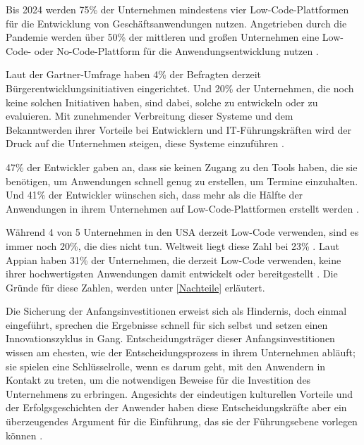 \documentclass[12pt]{article} %
\begin{document}
	Bis 2024 werden 75\% der Unternehmen mindestens vier Low-Code-Plattformen für die Entwicklung von Geschäftsanwendungen nutzen. Angetrieben durch die Pandemie werden über 50\% der mittleren und großen Unternehmen eine Low-Code- oder No-Code-Plattform für die Anwendungsentwicklung nutzen \autocite{KevinShuler.2023}. \newline
	
	Laut der Gartner-Umfrage haben 4\% der Befragten derzeit Bürgerentwicklungsinitiativen eingerichtet. Und 20\% der Unternehmen, die noch keine solchen Initiativen haben, sind dabei, solche zu entwickeln oder zu evaluieren. Mit zunehmender Verbreitung dieser Systeme und dem Bekanntwerden ihrer Vorteile bei Entwicklern und IT-Führungskräften wird der Druck auf die Unternehmen steigen, diese Systeme einzuführen \autocite{KevinShuler.2023}. \newline
	
	47\% der Entwickler gaben an, dass sie keinen Zugang zu den Tools haben, die sie benötigen, um Anwendungen schnell genug zu erstellen, um Termine einzuhalten. Und 41\% der Entwickler wünschen sich, dass mehr als die Hälfte der Anwendungen in ihrem Unternehmen auf Low-Code-Plattformen erstellt werden \autocite{KevinShuler.2023}. \newline
	
	Während 4 von 5 Unternehmen in den USA derzeit Low-Code verwenden, sind es immer noch 20\%, die dies nicht tun. Weltweit liegt diese Zahl bei 23\% \autocite{KevinShuler.2023}. Laut Appian haben 31\% der Unternehmen, die derzeit Low-Code verwenden, keine ihrer hochwertigsten Anwendungen damit entwickelt oder bereitgestellt \autocite{KevinShuler.2023}. Die Gründe für diese Zahlen, werden unter \ref{Nachteile} erläutert. \newline
	
	Die Sicherung der Anfangsinvestitionen erweist sich als Hindernis, doch einmal eingeführt, sprechen die Ergebnisse schnell für sich selbst und setzen einen Innovationszyklus in Gang. Entscheidungsträger dieser Anfangsinvestitionen wissen am ehesten, wie der Entscheidungsprozess in ihrem Unternehmen abläuft; sie spielen eine Schlüsselrolle, wenn es darum geht, mit den Anwendern in Kontakt zu treten, um die notwendigen Beweise für die Investition des Unternehmens zu erbringen. Angesichts der eindeutigen kulturellen Vorteile und der Erfolgsgeschichten der Anwender haben diese Entscheidungskräfte aber ein überzeugendes Argument für die Einführung, das sie der Führungsebene vorlegen können \autocite{Microsoft.2022}.
		
\end{document}
